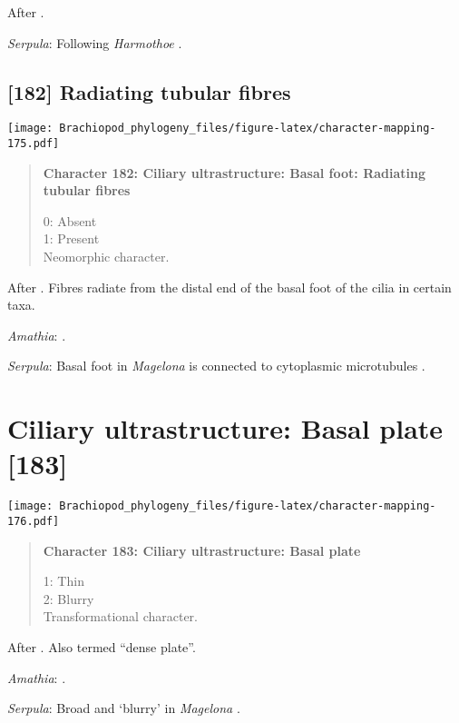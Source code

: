 \documentclass[openany]{book}
\theoremstyle{definition}
\theoremstyle{definition}
\theoremstyle{definition}
\theoremstyle{remark}
\begin{document}
After \citet{Lundin2009}.

\hypertarget{Serpula-coding-181}{}
\emph{Serpula}: Following \emph{Harmothoe} \citep{Holborow1969}.

\subsection*{{[}182{]} Radiating tubular
fibres}\label{radiating-tubular-fibres}

\texttt{[image: Brachiopod\_phylogeny\_files/figure-latex/character-mapping-175.pdf]}

\begin{quote}
\textbf{Character 182: Ciliary ultrastructure: Basal foot: Radiating
tubular fibres}

0: Absent\\
1: Present\\
Neomorphic character.
\end{quote}

After \citet{Lundin2009}. Fibres radiate from the distal end of the
basal foot of the cilia in certain taxa.

\hypertarget{Amathia-coding-182}{}
\emph{Amathia}: \citet{Reed1982}.

\hypertarget{Serpula-coding-182}{}
\emph{Serpula}: Basal foot in \emph{Magelona} is connected to
cytoplasmic microtubules \citep{Bartolomaeus1995}.

\section{Ciliary ultrastructure: Basal plate
{[}183{]}}\label{ciliary-ultrastructure-basal-plate-183}

\texttt{[image: Brachiopod\_phylogeny\_files/figure-latex/character-mapping-176.pdf]}

\begin{quote}
\textbf{Character 183: Ciliary ultrastructure: Basal plate}

1: Thin\\
2: Blurry\\
Transformational character.
\end{quote}

After \citet{Lundin2009}. Also termed ``dense plate''.

\hypertarget{Amathia-coding-183}{}
\emph{Amathia}: \citet{Reed1982}.

\hypertarget{Serpula-coding-183}{}
\emph{Serpula}: Broad and `blurry' in \emph{Magelona}
\citep{Bartolomaeus1995}.
\end{document}
